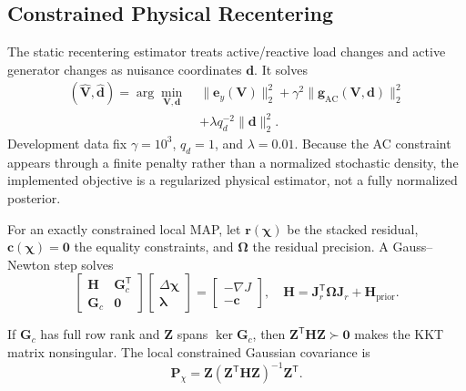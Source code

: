 \subsection{Constrained Physical Recentering}

The static recentering estimator treats active/reactive load changes and active generator changes as nuisance coordinates $\bm d$. It solves
\begin{equation}
 \begin{aligned}
 (\widehat{\bm V},\widehat{\bm d})
 =\arg\min_{\bm V,\bm d}\;&
 \|\bm e_y(\bm V)\|_2^2
 +\gamma^2\|\bm g_{\mathrm{AC}}(\bm V,\bm d)\|_2^2\\[-1mm]
 &+\lambda q_d^{-2}\|\bm d\|_2^2.
 \end{aligned}
 \label{eq:supp-recentering-objective}
\end{equation}
Development data fix $\gamma=10^3$, $q_d=1$, and $\lambda=0.01$. Because the AC constraint appears through a finite penalty rather than a normalized stochastic density, the implemented objective is a regularized physical estimator, not a fully normalized posterior.

For an exactly constrained local MAP, let $\bm r(\bm\chi)$ be the stacked residual, $\bm c(\bm\chi)=\bm0$ the equality constraints, and $\bm\Omega$ the residual precision. A Gauss--Newton step solves
\begin{equation}
 \begin{bmatrix}
 \bm H & \bm G_c^{\mathsf T}\\
 \bm G_c & \bm0
 \end{bmatrix}
 \begin{bmatrix}\Delta\bm\chi\\\bm\lambda\end{bmatrix}
 =
 \begin{bmatrix}-\nabla J\\-\bm c\end{bmatrix},
 \quad
 \bm H=\bm J_r^{\mathsf T}\bm\Omega\bm J_r+\bm H_{\mathrm{prior}}.
 \label{eq:supp-kkt-system}
\end{equation}

\begin{theorem}
If $\bm G_c$ has full row rank and $\bm Z$ spans $\ker\bm G_c$, then $\bm Z^{\mathsf T}\bm H\bm Z\succ\bm0$ makes the KKT matrix nonsingular. The local constrained Gaussian covariance is
\begin{equation}
 \bm P_{\chi}=\bm Z(\bm Z^{\mathsf T}\bm H\bm Z)^{-1}\bm Z^{\mathsf T}.
 \label{eq:supp-constrained-covariance}
\end{equation}
\end{theorem}

